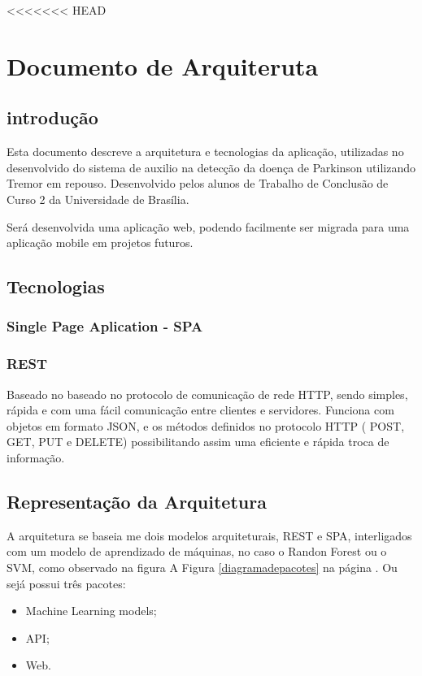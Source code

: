 \begin{anexosenv}

<<<<<<< HEAD
	\partanexos

	\chapter{Documento de Arquiteruta}
	\section{introdução}
	Esta documento descreve a arquitetura e tecnologias da aplicação, utilizadas no desenvolvido do sistema de auxilio na detecção da doença de Parkinson utilizando Tremor em repouso. Desenvolvido pelos alunos de Trabalho de Conclusão de Curso 2 da Universidade de Brasília.

	Será desenvolvida uma aplicação web, podendo facilmente ser migrada para uma aplicação mobile em projetos futuros.

	\section{Tecnologias}
	\subsection{Single Page Aplication - SPA}

	\subsection{REST}
	Baseado no baseado no protocolo de comunicação de rede HTTP, sendo simples, rápida e com uma fácil comunicação entre clientes e servidores. Funciona com objetos em formato JSON, e os métodos definidos no protocolo HTTP ( POST, GET, PUT e DELETE) possibilitando assim uma eficiente e rápida troca de informação.

	\section{Representação da Arquitetura}
	A arquitetura se baseia me dois modelos arquiteturais, REST e SPA, interligados com um modelo de aprendizado de máquinas, no caso o Randon Forest ou o SVM, como observado na figura A Figura \ref{diagramadepacotes} na página \pageref{diagramadepacotes}. Ou sejá possui três pacotes:

	\begin{itemize}
		\item Machine Learning models;
		\item API;
		\item Web.
	\end{itemize}



\end{anexosenv}
